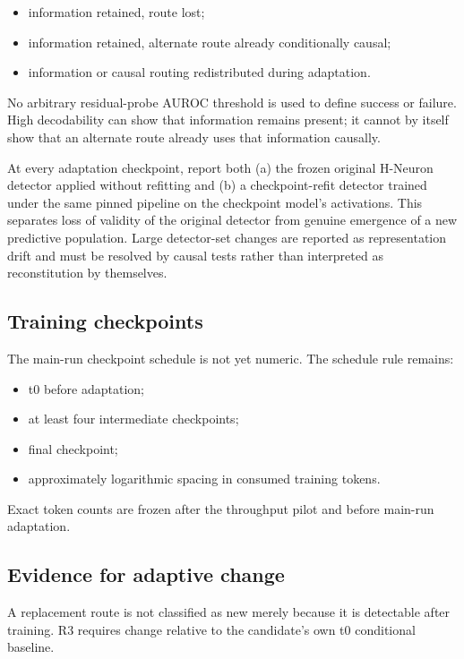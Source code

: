 \begin{itemize}
\tightlist
\item information retained, route lost;
\item information retained, alternate route already conditionally causal;
\item information or causal routing redistributed during adaptation.
\end{itemize}

No arbitrary residual-probe AUROC threshold is used to define success or failure. High decodability can show that information remains present; it cannot by itself show that an alternate route already uses that information causally.

At every adaptation checkpoint, report both (a) the frozen original H-Neuron detector applied without refitting and (b) a checkpoint-refit detector trained under the same pinned pipeline on the checkpoint model's activations. This separates loss of validity of the original detector from genuine emergence of a new predictive population. Large detector-set changes are reported as representation drift and must be resolved by causal tests rather than interpreted as reconstitution by themselves.

\subsection{Training checkpoints}\label{training-checkpoints}

The main-run checkpoint schedule is not yet numeric. The schedule rule remains:

\begin{itemize}
\tightlist
\item t0 before adaptation;
\item at least four intermediate checkpoints;
\item final checkpoint;
\item approximately logarithmic spacing in consumed training tokens.
\end{itemize}

Exact token counts are frozen after the throughput pilot and before main-run adaptation.

\subsection{Evidence for adaptive change}\label{evidence-for-emergence}

A replacement route is not classified as new merely because it is detectable after training. R3 requires change relative to the candidate's own t0 conditional baseline.

